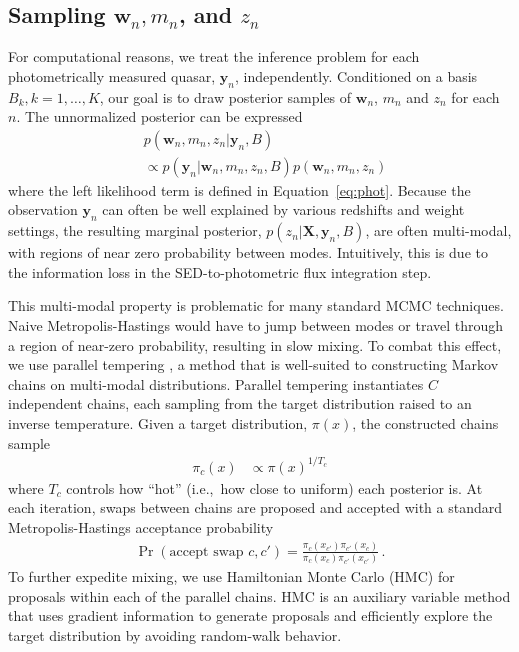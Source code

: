 \documentclass{article}
\begin{document}
\subsection{Sampling $\mathbf{w}_n, m_n$, and $z_n$}
For computational reasons, we treat the inference problem for each photometrically measured quasar, $\mathbf{y}_n$, independently.
Conditioned on a basis~${B_k, k=1,\dots, K}$, our goal is to draw posterior samples of $\mathbf{w}_n$, $m_n$ and $z_n$ for each $n$.  
The unnormalized posterior can be expressed
\begin{align}
  &p(\mathbf{w}_n, m_n, z_n | \mathbf{y}_n, B) \\
  &\propto p(\mathbf{y}_n | \mathbf{w}_n, m_n, z_n, B) p(\mathbf{w}_n, m_n, z_n) \end{align}
where the left likelihood term is defined in Equation~\ref{eq:phot}.
Because the observation $\mathbf{y}_n$ can often be well explained by various redshifts and weight settings, the resulting marginal posterior, $p(z_n | \mathbf{X}, \mathbf{y}_n, B)$, are often multi-modal, with regions of near zero probability between modes.
Intuitively, this is due to the information loss in the SED-to-photometric flux integration step.

This multi-modal property is problematic for many standard MCMC techniques. 
Naive Metropolis-Hastings would have to jump between modes or travel through a region of near-zero probability, resulting in slow mixing.  
To combat this effect, we use parallel tempering \cite{brooks2011handbook}, a method that is well-suited to constructing Markov chains on multi-modal distributions.
Parallel tempering instantiates $C$ independent chains, each sampling from the target distribution raised to an inverse temperature.
Given a target distribution, $\pi(x)$, the constructed chains sample 
\begin{align}
  \pi_c(x) &\propto \pi(x)^{1/T_c}
\end{align}
where $T_c$ controls how ``hot'' (i.e.,~how close to uniform) each posterior is. 
At each iteration, swaps between chains are proposed and accepted with a standard Metropolis-Hastings acceptance probability 
\begin{align}
  \Pr(\text{accept swap } c, c') = \frac{ \pi_c(x_{c'}) \pi_{c'}(x_c) }{ \pi_c(x_c) \pi_{c'}(x_{c'}) } \, .
\end{align}
To further expedite mixing, we use Hamiltonian Monte Carlo (HMC) \cite{neal2011mcmc} for proposals within each of the parallel chains.
HMC is an auxiliary variable method that uses gradient information to generate proposals and efficiently explore the target distribution by avoiding random-walk behavior.
\end{document}
